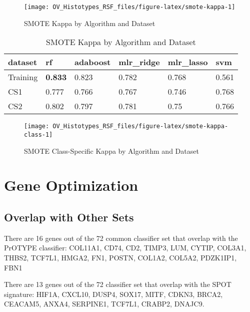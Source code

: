 \documentclass[
]{report}
\begin{document}
\begin{figure}[H]

{\centering \texttt{[image: OV\_Histotypes\_RSF\_files/figure-latex/smote-kappa-1]} 

}

\caption{SMOTE Kappa by Algorithm and Dataset}\label{fig:smote-kappa}
\end{figure}

\begin{table}

\caption{\label{tab:smote-kappa-table}SMOTE Kappa by Algorithm and Dataset}
\centering
\begin{tabular}[t]{l|l|l|l|l|l}
\hline
dataset & rf & adaboost & mlr\_ridge & mlr\_lasso & svm\\
\hline
Training & \textbf{0.833} & 0.823 & 0.782 & 0.768 & 0.561\\
\hline
CS1 & 0.777 & 0.766 & 0.767 & 0.746 & 0.768\\
\hline
CS2 & 0.802 & 0.797 & 0.781 & 0.75 & 0.766\\
\hline
\end{tabular}
\end{table}

\begin{figure}[H]

{\centering \texttt{[image: OV\_Histotypes\_RSF\_files/figure-latex/smote-kappa-class-1]} 

}

\caption{SMOTE Class-Specific Kappa by Algorithm and Dataset}\label{fig:smote-kappa-class}
\end{figure}

\hypertarget{gene-optimization}{%
\section{Gene Optimization}\label{gene-optimization}}

\hypertarget{overlap-with-other-sets}{%
\subsection{Overlap with Other Sets}\label{overlap-with-other-sets}}

There are 16 genes out of the 72 common classifier set that overlap with the PrOTYPE classifier: COL11A1, CD74, CD2, TIMP3, LUM, CYTIP, COL3A1, THBS2, TCF7L1, HMGA2, FN1, POSTN, COL1A2, COL5A2, PDZK1IP1, FBN1

There are 13 genes out of the 72 classifier set that overlap with the SPOT signature: HIF1A, CXCL10, DUSP4, SOX17, MITF, CDKN3, BRCA2, CEACAM5, ANXA4, SERPINE1, TCF7L1, CRABP2, DNAJC9.
\end{document}
